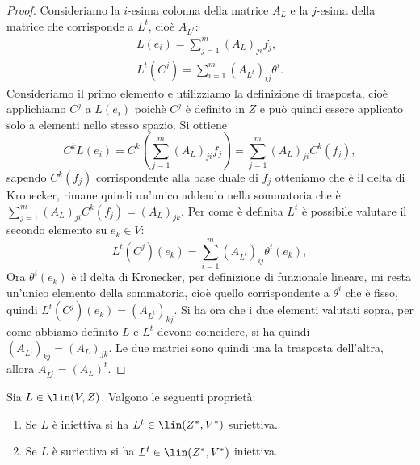 \begin{proof} %
	Consideriamo la $i$-esima colonna della matrice $A_L$ e la $j$-esima della matrice che corrisponde a $L^t$, cioè $A_{L^t}$:
	\begin{gather*}
		L(e_i) = \sum_{j=1}^m(A_L)_{ji}f_j,\\
		L^t(C^j) = \sum_{i=1}^m(A_{L^t})_{ij}\theta^i.
	\end{gather*}
	Consideriamo il primo elemento e utilizziamo la definizione di trasposta, cioè applichiamo $C^j$ a $L(e_i)$ poichè $C^j$ è definito in $Z$ e può quindi essere applicato solo a elementi nello stesso spazio.
	Si ottiene
	\begin{equation*}
		C^k L(e_i) = C^k(\sum_{j=1}^m(A_L)_{ji}f_j) = \sum_{j=1}^m(A_L)_{ji}C^k(f_j),
	\end{equation*}
	sapendo $C^k(f_j)$ corrispondente alla base duale di $f_j$ otteniamo che è il delta di Kronecker, rimane quindi un'unico addendo nella sommatoria che è  $\sum_{j=1}^m(A_L)_{ji}C^k(f_j) = (A_L)_{jk}$.
	Per come è definita $L^t$ è possibile valutare il secondo elemento su $e_k\in V$:
	\begin{equation*}
		L^t(C^j)(e_k) =  \sum_{i=1}^m(A_{L^t})_{ij}\theta^i(e_k),
	\end{equation*} 
	Ora $\theta^i(e_k)$ è il delta di Kronecker, per definizione di funzionale lineare, mi resta un'unico elemento della sommatoria, cioè quello corrispondente a $\theta^i$ che è fisso, quindi $L^t(C^j)(e_k) = (A_{L^t})_{kj}$.
	Si ha ora che i due elementi valutati sopra, per come abbiamo definito $L$ e $L^t$ devono coincidere, si ha quindi $(A_{L^t})_{kj} = (A_L)_{jk}$.
	Le due matrici sono quindi una la trasposta dell'altra, allora $A_{L^t} = (A_L)^t$.
\end{proof}
\begin{teorema}
	Sia $L\in\lin(V,Z)$.
	Valgono le seguenti proprietà:
	\begin{enumerate}
		\item Se $L$ è iniettiva si ha $L^t\in \lin(Z^*,V^*)$ suriettiva. 
		\item Se $L$ è suriettiva si ha $L^t\in \lin(Z^*,V^*)$ iniettiva.
	\end{enumerate}
\end{teorema}
